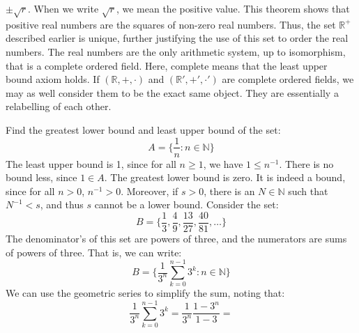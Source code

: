             $\pm\sqrt{r}$. When we write $\sqrt{r}$, we mean the
            positive value. This theorem shows that positive real
            numbers are the squares of non-zero real numbers.
            Thus, the set $\mathbb{R}^{+}$ described earlier is
            unique, further justifying the use of this set to
            order the real numbers. The real numbers are the only
            arithmetic system, up to isomorphism, that is a
            complete ordered field. Here, complete means that the
            least upper bound axiom holds. If
            $(\mathbb{R},+,\cdot)$ and $(\mathbb{R}',+',\cdot')$
            are complete ordered fields, we may as well consider
            them to be the exact same object. They are essentially
            a relabelling of each other.
            \begin{lexample}
                Find the greatest lower bound and least upper bound
                of the set:
                \begin{equation}
                    A=\{\frac{1}{n}:n\in\mathbb{N}\}
                \end{equation}
                The least upper bound is 1, since for all
                $n\geq{1}$, we have $1\leq{n}^{\minus{1}}$. There
                is no bound less, since $1\in{A}$. The greatest
                lower bound is zero. It is indeed a bound, since
                for all $n>0$, $n^{\minus{1}}>0$. Moreover, if
                $s>0$, there is an $N\in\mathbb{N}$ such that
                $N^{\minus{1}}<s$, and thus $s$ cannot be a lower
                bound. Consider the set:
                \begin{equation}
                    B=\{\frac{1}{3},\frac{4}{9},
                        \frac{13}{27},\frac{40}{81},\dots\}
                \end{equation}
                The denominator's of this set are powers of
                three, and the numerators are sums of powers of
                three. That is, we can write:
                \begin{equation}
                    B=\Big\{\frac{1}{3^{n}}\sum_{k=0}^{n-1}3^{k}:
                        n\in\mathbb{N}\Big\}
                \end{equation}
                We can use the geometric series to simplify the
                sum, noting that:
                \begin{equation}
                    \frac{1}{3^{n}}\sum_{k=0}^{n-1}3^{k}=
                    \frac{1}{3^{n}}\frac{1-3^{n}}{1-3}=

\end{equation}
\end{lexample}
